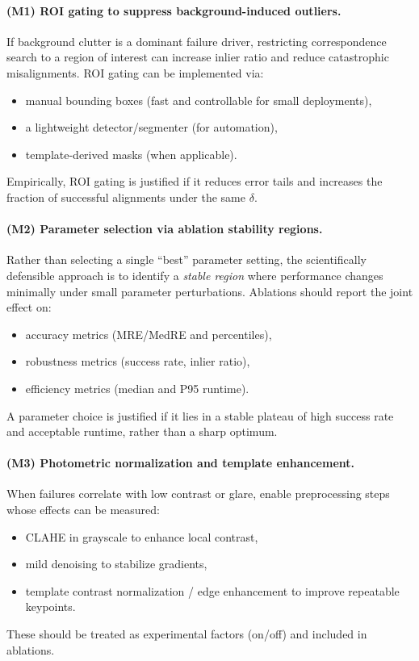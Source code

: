 \paragraph{(M1) ROI gating to suppress background-induced outliers.}
If background clutter is a dominant failure driver, restricting correspondence search to a region of interest can increase inlier ratio and reduce catastrophic misalignments. ROI gating can be implemented via:
\begin{itemize}
  \item manual bounding boxes (fast and controllable for small deployments),
  \item a lightweight detector/segmenter (for automation),
  \item template-derived masks (when applicable).
\end{itemize}
Empirically, ROI gating is justified if it reduces error tails and increases the fraction of successful alignments under the same $\delta$.

\paragraph{(M2) Parameter selection via ablation stability regions.}
Rather than selecting a single ``best'' parameter setting, the scientifically defensible approach is to identify a \emph{stable region} where performance changes minimally under small parameter perturbations. Ablations should report the joint effect on:
\begin{itemize}
  \item accuracy metrics (MRE/MedRE and percentiles),
  \item robustness metrics (success rate, inlier ratio),
  \item efficiency metrics (median and P95 runtime).
\end{itemize}
A parameter choice is justified if it lies in a stable plateau of high success rate and acceptable runtime, rather than a sharp optimum.

\paragraph{(M3) Photometric normalization and template enhancement.}
When failures correlate with low contrast or glare, enable preprocessing steps whose effects can be measured:
\begin{itemize}
  \item CLAHE in grayscale to enhance local contrast,
  \item mild denoising to stabilize gradients,
  \item template contrast normalization / edge enhancement to improve repeatable keypoints.
\end{itemize}
These should be treated as experimental factors (on/off) and included in ablations.

